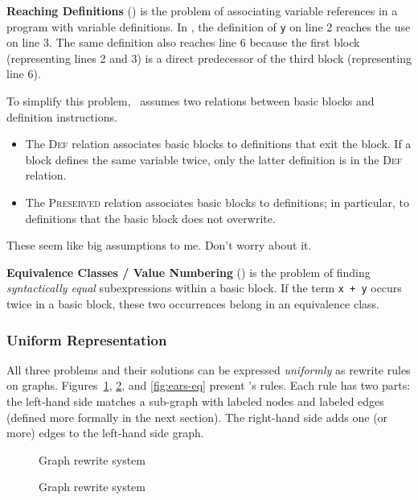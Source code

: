 \documentclass{article}
\begin{document}
\noindent\textbf{Reaching Definitions} ({\rd}) is the problem of associating variable references in a program with variable definitions.
In , the definition of {\tt y} on line 2 reaches the use on line 3.
The same definition also reaches line 6 because the first block (representing lines 2 and 3) is a direct predecessor of the third block (representing line 6).

To simplify this problem, \assmann\ assumes two relations between basic blocks and definition instructions.
\begin{itemize}
\item The \textsc{Def} relation associates basic blocks to definitions that exit the block.
      If a block defines the same variable twice, only the latter definition is in the \textsc{Def} relation.
\item The \textsc{Preserved} relation associates basic blocks to definitions; in particular, to definitions that the basic block does not overwrite.
\end{itemize}
These seem like big assumptions to me. Don't worry about it.

\vspace{2ex}

\noindent\textbf{Equivalence Classes / Value Numbering} ({\eq}) is the problem of finding \emph{syntactically equal} subexpressions within a basic block.
If the term {\tt x + y} occurs twice in a basic block, these two occurrences belong in an equivalence class.


\subsubsection*{Uniform Representation}

All three problems and their solutions can be expressed \emph{uniformly} as rewrite rules on graphs.
Figures~\ref{fig:ears-bb}, \ref{fig:ears-rd}, and \ref{fig:ears-eq} present \assmann{}'s rules.
Each rule has two parts: the left-hand side matches a sub-graph with labeled nodes and labeled edges (defined more formally in the next section).
The right-hand side adds one (or more) edges to the left-hand side graph.

\begin{figure}[t]
  
\caption{Graph rewrite system {\bb}}
\label{fig:ears-bb}
\end{figure}

\begin{figure}[th]
  
\caption{Graph rewrite system {\rd}}
\label{fig:ears-rd}
\end{figure}
\end{document}

